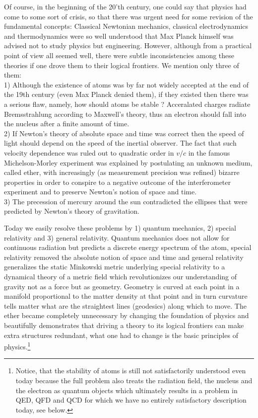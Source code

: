 \documentclass[12pt]{report}
\begin{document}
Of course, in the beginning of the 20'th century, one could say that 
physics had come to some sort of crisis, so that there was urgent need 
for some revision of the fundamental concepts: Classical 
Newtonian mechanics, classical
electrodynamics and thermodynamics were so well understood that Max Planck
himself was advised not to study physics but engineering. However, 
although from a practical point of view all seemed well, there were
subtle inconsistencies among these theories if one drove them to their
logical frontiers. We mention only three of them:\\
1) Although the existence 
of atoms was by far not widely accepted at the end of the 19th century 
(even Max Planck denied them), if they existed then there was a serious 
flaw, namely, how should atoms be stable ? Acceralated charges radiate 
Bremsstrahlung according to Maxwell's theory, thus an electron should fall 
into the nucleus after a finite amount of time. \\
2) If Newton's theory of absolute space and time was correct then 
the speed of light should depend on the speed of the inertial
observer. The fact that such velocity dependence was ruled out 
to quadratic order in $v/c$ in the famous Michelson-Morley experiment
was explained by postulating an unknown medium, called ether, with
increasingly (as measurement precision was refined) bizarre properties
in order to conspire to a negative outcome of the interferometer
experiment and to preserve Newton's notion of space and time.\\
3) The precession of mercury around the sun contradicted the ellipses
that were predicted by Newton's theory of gravitation.

Today we easily resolve these problems by 1) quantum mechanics,
2) special relativity and 3) general relativity. Quantum mechanics 
does not allow for continuous radiation but predicts a discrete energy 
spectrum of the atom, special relativity removed the absolute notion of 
space and time and general relativity generalizes the static Minkowski metric
underlying special relativity to a dynamical theory of a metric field 
which revolutionizes our understanding of gravity not as a force but
as geometry. Geometry is curved at each point in a manifold proportional
to the matter density at that point and in turn curvature tells matter
what are the straightest lines (geodesics) along which to move. The 
ether became completely unnecessary by changing the foundation of 
physics and beautifully demonstrates that driving a theory to 
its logical frontiers can make extra structures redundant, what one 
had to change is the basic principles of physics.\footnote{
Notice, that the stability of atoms is still not
satisfactorily understood even today because the full problem also treats 
the radiation field, the nucleus and the electron as quantum objects
which ultimately results in a problem in QED, QFD and QCD for which we 
have no entirely satisfactory description today, see below.} 
 
\end{document}
